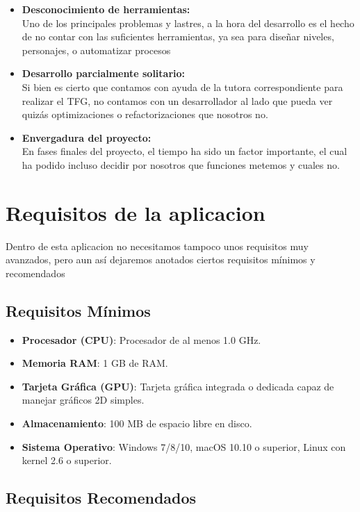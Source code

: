 \documentclass[a4paper]{article}
\begin{document}
\begin{itemize}
    \item \textbf{Desconocimiento de herramientas:} \\
          Uno de los principales problemas y lastres, a la hora del desarrollo es el hecho de no contar con las suficientes herramientas, ya sea para diseñar niveles, personajes, o automatizar procesos

    \item \textbf{Desarrollo parcialmente solitario:} \\
          Si bien es cierto que contamos con ayuda de la tutora correspondiente para realizar el TFG, no contamos con un desarrollador al lado que pueda ver quizás optimizaciones o refactorizaciones que nosotros no.

    \item \textbf{Envergadura del proyecto:}\\
          En fases finales del proyecto, el tiempo ha sido un factor importante, el cual ha podido incluso decidir por nosotros que funciones metemos y cuales no.
\end{itemize}


\clearpage
\section{Requisitos de la aplicacion}
Dentro de esta aplicacion no necesitamos tampoco unos requisitos muy avanzados, pero aun así dejaremos anotados ciertos requisitos mínimos y recomendados
\subsection{Requisitos Mínimos}

\begin{itemize}
    \item \textbf{Procesador (CPU)}: Procesador de al menos 1.0 GHz.
    \item \textbf{Memoria RAM}: 1 GB de RAM.
    \item \textbf{Tarjeta Gráfica (GPU)}: Tarjeta gráfica integrada o dedicada capaz de manejar gráficos 2D simples.
    \item \textbf{Almacenamiento}: 100 MB de espacio libre en disco.
    \item \textbf{Sistema Operativo}: Windows 7/8/10, macOS 10.10 o superior, Linux con kernel 2.6 o superior.
\end{itemize}

\subsection{Requisitos Recomendados}
\end{document}
